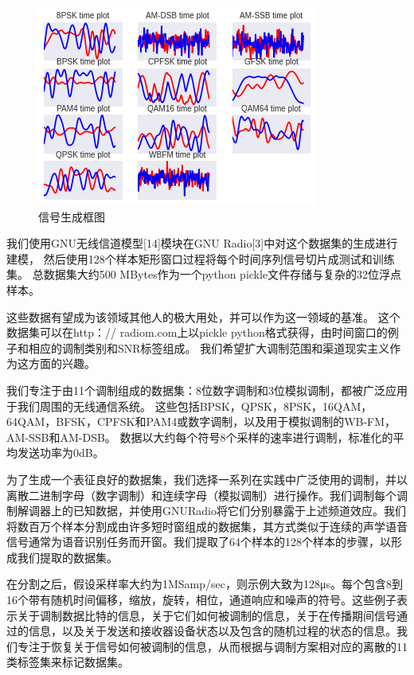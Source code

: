 \begin{figure}[!h]
	\centering
	\includegraphics[scale=0.9]{figures/chapter_3/signal_view_1}
	\caption{信号生成框图}\label{sec:fig_3_0}
\end{figure}

我们使用GNU无线信道模型[14]模块在GNU Radio[3]中对这个数据集的生成进行建模，
然后使用128个样本矩形窗口过程将每个时间序列信号切片成测试和训练集。 
总数据集大约500 MBytes作为一个python pickle文件存储与复杂的32位浮点样本。\par

这些数据有望成为该领域其他人的极大用处，并可以作为这一领域的基准。 这个数据集可以在http：// radiom.com上以pickle python格式获得，由时间窗口的例子和相应的调制类别和SNR标签组成。 我们希望扩大调制范围和渠道现实主义作为这方面的兴趣。\par

我们专注于由11个调制组成的数据集：8位数字调制和3位模拟调制，都被广泛应用于我们周围的无线通信系统。 这些包括BPSK，QPSK，8PSK，16QAM，64QAM，BFSK，CPFSK和PAM4或数字调制，以及用于模拟调制的WB-FM，AM-SSB和AM-DSB。 数据以大约每个符号8个采样的速率进行调制，标准化的平均发送功率为0dB。\par

为了生成一个表征良好的数据集，我们选择一系列在实践中广泛使用的调制，并以离散二进制字母（数字调制）和连续字母（模拟调制）进行操作。我们调制每个调制解调器上的已知数据，并使用GNURadio将它们分别暴露于上述频道效应。我们将数百万个样本分割成由许多短时窗组成的数据集，其方式类似于连续的声学语音信号通常为语音识别任务而开窗。我们提取了64个样本的128个样本的步骤，以形成我们提取的数据集。\par

在分割之后，假设采样率大约为1MSamp/sec，则示例大致为128μs。每个包含8到16个带有随机时间偏移，缩放，旋转，相位，通道响应和噪声的符号。这些例子表示关于调制数据比特的信息，关于它们如何被调制的信息，关于在传播期间信号通过的信息，以及关于发送和接收器设备状态以及包含的随机过程的状态的信息。我们专注于恢复关于信号如何被调制的信息，从而根据与调制方案相对应的离散的11类标签集来标记数据集。\par


